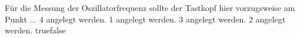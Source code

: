     {Für die Messung der Oszillatorfrequenz sollte der Tastkopf hier vorzugsweise am Punkt ...}
    {4 angelegt werden.}
    {1 angelegt werden.}
    {3 angelegt werden.}
    {2 angelegt werden.}
    {true}{false}
